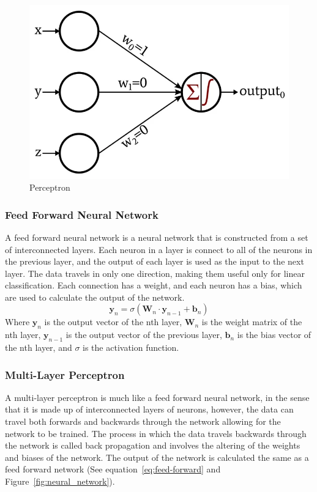 \documentclass[titlepage]{article}
\begin{document}
\begin{figure}[h!]
    \includegraphics[width=\textwidth]{./assets/perceptron.png}
    \caption{Perceptron}
    \label{fig:perceptron}
\end{figure}

\subsubsection{Feed Forward Neural Network}
A feed forward neural network is a neural network that is constructed from a set of interconnected layers. Each neuron in a layer is connect to all of the neurons in the previous layer, and the output of each layer is used as the input to the next layer. The data travels in only one direction, making them useful only for linear classification. Each connection has a weight, and each neuron has a bias, which are used to calculate the output of the network.
\begin{equation}
    \textbf{y}_n=\sigma{(\textbf{W}_n\cdot\textbf{y}_{n-1} + \textbf{b}_n)}
    \label{eq:feed-forward}
\end{equation}
Where $\textbf{y}_n$ is the output vector of the nth layer, $\textbf{W}_n$ is the weight matrix of the nth layer, $\textbf{y}_{n-1}$ is the output vector of the previous layer, $\textbf{b}_n$ is the bias vector of the nth layer, and $\sigma$ is the activation function.

\subsubsection{Multi-Layer Perceptron}
A multi-layer perceptron is much like a feed forward neural network, in the sense that it is made up of interconnected layers of neurons, however, the data can travel both forwards and backwards through the network allowing for the network to be trained. The process in which the data travels backwards through the network is called back propagation and involves the altering of the weights and biases of the network. The output of the network is calculated the same as a feed forward network (See equation~\ref{eq:feed-forward} and Figure~\ref{fig:neural_network}).
\end{document}
